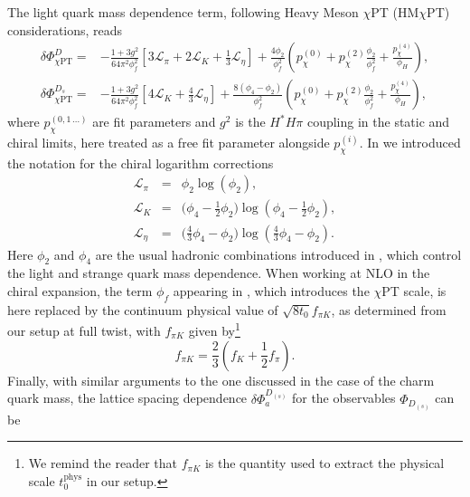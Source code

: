 The light quark mass dependence term, following Heavy Meson $\chi$PT (HM$\chi$PT) considerations,
reads~\cite{Goity:1992tp, Bazavov:2017lyh}
\begin{equation}
	\begin{split}
		\delta \Phi_{\chi {\mathrm{PT}}}^{D} =& - \frac{1+3g^2}{64\pi^2 \phi_f^2} \left[ 3 \mathcal{L}_{\pi} + 2 \mathcal{L}_{K} + \frac{1}{3} \mathcal{L}_{\eta} \right] +
		\frac{4  \phi_2 }{\phi_f^2} \left( p_\chi^{(0)} +  p_\chi^{(2)} \frac{\phi_2}{\phi_f^2} + \frac{p_\chi^{(4)}}{\phi_H} \right),
		\\
		\delta \Phi_{\chi {\mathrm{PT}}}^{D_s} =& - \frac{1+3g^2}{64\pi^2 \phi_f^2} \left[ 4 \mathcal{L}_{K} + \frac{4}{3}  \mathcal{L}_{\eta} \right] +
		\frac{8 \left( \phi_4 - \phi_2 \right)} {\phi_f^2} \left( p_\chi^{(0)} +  p_\chi^{(2)} \frac{\phi_2}{\phi_f^2} + \frac{p_\chi^{(4)}}{\phi_H} \right),
		\label{eq:deltaphichis} 
	\end{split}
\end{equation}
where $p_\chi^{(0,1\,\dots)}$ are fit parameters and $g^2$ is the
$H^\ast H \pi$ coupling in the static and chiral limits, here treated as a free fit parameter alongside
$p_\chi^{(i)}$.  In  we introduced  the notation for the chiral logarithm corrections 
\begin{eqnarray}
	\mathcal{L}_\pi &=& \phi_2 \log(\phi_2), 
	\\
	\mathcal{L}_K &=& \bigg(\phi_4 - \frac{1}{2}\phi_2\bigg)\log(\phi_4 - \frac{1}{2}\phi_2), 
	\\
	\mathcal{L}_\eta &= &\bigg(\frac{4}{3}\phi_4 - \phi_2\bigg)\log(\frac{4}{3}\phi_4 - \phi_2).
\end{eqnarray}
Here $\phi_2$ and $\phi_4$ are the usual hadronic combinations introduced  in ,
which control the light and strange quark mass dependence. When working at NLO in the chiral expansion, 
the term
$\phi_f$ appearing in , which introduces the $\chi$PT scale,
is here replaced by the continuum
physical value  of $\sqrt{8 t_0} f_{\pi K}$, as determined from our setup \cite{MA1} at full twist, with $f_{\pi K}$ given by\footnote{We remind the reader that $f_{\pi K}$ is the quantity used to extract the physical scale $t_0^{\mathrm{phys}}$ in our setup.}
\begin{equation}
	f_{\pi K} = \frac{2}{3} \left(
	f_K + \frac{1}{2}f_\pi
	\right).
\end{equation}
Finally, with similar arguments to the one discussed in the case of the charm quark mass,
the lattice spacing dependence $\delta\Phi_a^{D_{(s)}}$ for the observables $\Phi_{D_{(s)}}$ can be 
